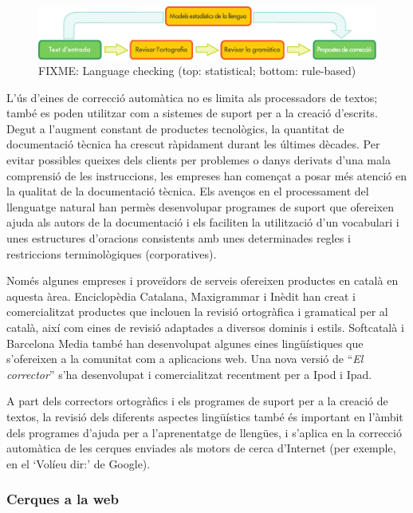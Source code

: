 \documentclass[]{../../metanetpaper}
\begin{document}
\begin{multicols}{2}
\begin{figure}[htb]
  \vspace{-9mm}
  \center
  \includegraphics[width=\textwidth]{../_media/catalan/language_checking}
  \caption{FIXME: Language checking (top: statistical; bottom: rule-based)}
  \label{fig:langcheckingaarch_ca}
\end{figure}

L’ús d’eines de correcció automàtica no es limita als processadors de textos; també es poden utilitzar com a sistemes de suport per a la creació d’escrits. Degut a l’augment constant de productes tecnològics, la quantitat de documentació tècnica ha crescut ràpidament durant les últimes dècades. Per evitar possibles queixes dels clients per problemes o danys derivats d’una mala comprensió de les instruccions, les empreses han començat a posar més atenció en la qualitat de la documentació tècnica. Els avenços en el processament del llenguatge natural han permès desenvolupar programes de suport que ofereixen ajuda als autors de la documentació i els faciliten la utilització d’un vocabulari i unes estructures d’oracions consistents amb unes determinades regles i restriccions terminològiques (corporatives).

Només algunes empreses i proveïdors de serveis ofereixen productes en català en aquesta àrea. Enciclopèdia Catalana, Maxigrammar i Inèdit han creat i comercialitzat productes que inclouen la revisió ortogràfica i gramatical per al català, així com eines de revisió adaptades a diversos dominis i estils. Softcatalà i Barcelona Media també han desenvolupat algunes eines lingüístiques que s’ofereixen a la comunitat com a aplicacions web. Una nova versió de “\textit{El corrector}” s’ha desenvolupat i comercialitzat recentment per a Ipod i Ipad. 

A part dels correctors ortogràfics i els programes de suport per a la creació de textos, la revisió dels diferents aspectes lingüístics també és important en l’àmbit dels programes d’ajuda per a l’aprenentatge de llengües, i s’aplica en la correcció automàtica de les cerques enviades als motors de cerca d’Internet (per exemple, en el ‘Volíeu dir:’ de Google). 

\subsubsection{Cerques a la web}


\end{multicols}
\end{document}
